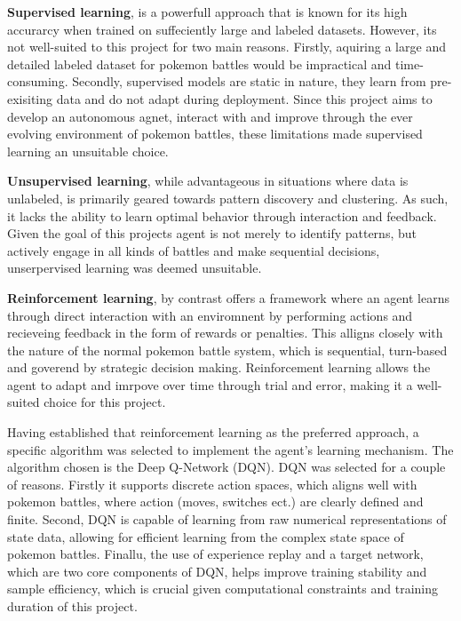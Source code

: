 \textbf{Supervised learning}, is a powerfull approach that is known for its high accurarcy when trained on
suffeciently large and labeled datasets. However, its not well-suited to this project for
two main reasons. Firstly, aquiring a large and detailed labeled dataset for pokemon battles
would be impractical and time-consuming. Secondly, supervised models are static in nature, they learn
from pre-exisiting data and do not adapt during deployment. Since this project aims to develop
an autonomous agnet, interact with and improve through the ever evolving environment of pokemon battles, 
these limitations made supervised learning an unsuitable choice.

\textbf{Unsupervised learning}, while advantageous in situations where data is unlabeled, is primarily
geared towards pattern discovery and clustering. As such, it lacks the ability to learn 
optimal behavior through interaction and feedback. Given the goal of this projects agent is not
merely to identify patterns, but actively engage in all kinds of battles and make sequential decisions,
unserpervised learning was deemed unsuitable.

\textbf{Reinforcement learning}, by contrast offers a framework where an agent learns through direct interaction
with an enviromnent by performing actions and recieveing feedback in the form of rewards or penalties.
This alligns closely with the nature of the normal pokemon battle system, which is sequential, 
turn-based and goverend by strategic decision making. Reinforcement learning allows the agent to
adapt and imrpove over time through trial and error, making it a well-suited choice for this project.

Having established that reinforcement learning as the preferred approach, a specific algorithm
was selected to implement the agent's learning mechanism. The algorithm chosen is the 
Deep Q-Network (DQN). DQN was selected for a couple of reasons. Firstly it supports discrete 
action spaces, which aligns well with pokemon battles, where action (moves, switches ect.) are
clearly defined and finite. Second, DQN is capable of learning from raw numerical representations
of state data, allowing for efficient learning from the complex state space of pokemon battles.
Finallu, the use of experience replay and a target network, which are two core components of DQN, 
helps improve training stability and sample efficiency, which is crucial given computational constraints
and training duration of this project.